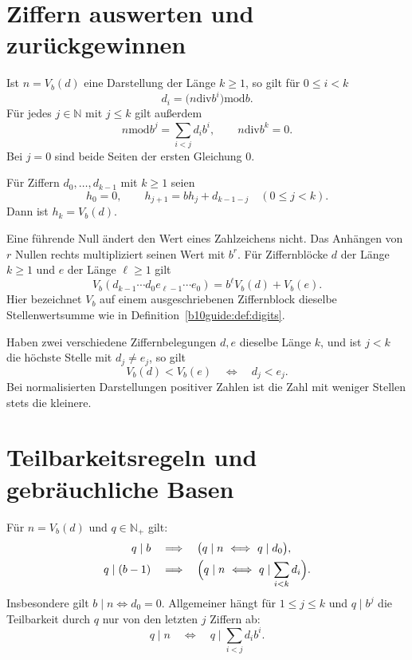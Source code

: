 \section{Ziffern auswerten und zurückgewinnen}

\begin{theorem}
Ist $n=V_b(d)$ eine Darstellung der Länge $k\ge1$, so gilt
für $0\le i<k$
\[
 d_i=\bigl(n\mathbin{\mathrm{div}}b^i\bigr)\mathbin{\mathrm{mod}}b.
\]
Für jedes $j\in\mathbb N$ mit $j\le k$ gilt außerdem
\[
 n\mathbin{\mathrm{mod}}b^j=\sum_{i<j}d_i b^i,
 \qquad
 n\mathbin{\mathrm{div}}b^k=0.
\]
Bei $j=0$ sind beide Seiten der ersten Gleichung $0$.
\end{theorem}

\begin{theorem}
Für Ziffern $d_0,\ldots,d_{k-1}$ mit $k\ge1$ seien
\[
 h_0=0,\qquad h_{j+1}=b h_j+d_{k-1-j}\quad(0\le j<k).
\]
Dann ist $h_k=V_b(d)$.
\end{theorem}

\begin{theorem}
Eine führende Null ändert den Wert eines Zahlzeichens nicht.
Das Anhängen von $r$ Nullen rechts multipliziert seinen Wert mit $b^r$.
Für Ziffernblöcke $d$ der Länge $k\ge1$ und $e$ der Länge
$\ell\ge1$ gilt
\[
 V_b(d_{k-1}\cdots d_0e_{\ell-1}\cdots e_0)
 =b^\ell V_b(d)+V_b(e).
\]
Hier bezeichnet $V_b$ auf einem ausgeschriebenen Ziffernblock
dieselbe Stellenwertsumme wie in Definition~\ref{b10guide:def:digits}.
\end{theorem}

\begin{theorem}
Haben zwei verschiedene Ziffernbelegungen $d,e$ dieselbe Länge $k$,
und ist $j<k$ die höchste Stelle mit $d_j\ne e_j$, so gilt
\[
 V_b(d)<V_b(e)\quad\Longleftrightarrow\quad d_j<e_j.
\]
Bei normalisierten Darstellungen positiver Zahlen ist die Zahl
mit weniger Stellen stets die kleinere.
\end{theorem}

\section{Teilbarkeitsregeln und gebräuchliche Basen}

\begin{theorem}
Für $n=V_b(d)$ und $q\in\mathbb N_+$ gilt:
\[
\begin{aligned}
 q\mid b\quad&\Longrightarrow\quad
       \bigl(q\mid n\ \Longleftrightarrow\ q\mid d_0\bigr),\\
 q\mid(b-1)\quad&\Longrightarrow\quad
       \Bigl(q\mid n\ \Longleftrightarrow\ q\mid\sum_{i<k}d_i\Bigr).
\end{aligned}
\]
Insbesondere gilt $b\mid n\Longleftrightarrow d_0=0$.
Allgemeiner hängt für $1\le j\le k$ und $q\mid b^j$
die Teilbarkeit durch $q$ nur von den letzten $j$ Ziffern ab:
\[
 q\mid n\quad\Longleftrightarrow\quad q\mid\sum_{i<j}d_i b^i.
\]
\end{theorem}

